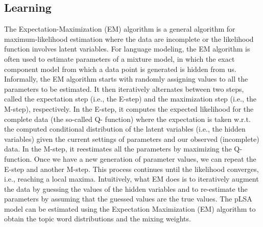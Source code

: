 \subsection{Learning}
The Expectation-Maximization (EM) algorithm is a general algorithm for maximum-likelihood estimation where the data are incomplete or the likelihood function involves latent variables. For language modeling, the EM algorithm is often used to estimate parameters of a mixture model, in which the exact component model from which a data point is generated is hidden from us. Informally, the EM algorithm starts with randomly assigning values to all the parameters to be estimated. It then iteratively alternates between two steps, called the expectation step (i.e., the E-step) and the maximization step (i.e., the M-step), respectively. In the E-step, it computes the expected likelihood for the complete data (the so-called Q- function) where the expectation is taken w.r.t. the computed conditional distribution of the latent variables (i.e., the hidden variables) given the current settings of parameters and our observed (incomplete) data. In the M-step, it reestimates all the parameters by maximizing the Q-function. Once we have a new generation of parameter values, we can repeat the E-step and another M-step. This process continues until the likelihood converges, i.e., reaching a local maxima. Intuitively, what EM does is to iteratively augment the data by guessing the values of the hidden variables and to re-estimate the parameters by assuming that the guessed values are the true values. \cite{dempster1977maximum}
The pLSA model can be estimated using the Expectation Maximization (EM) algorithm \cite{mei2001note} to obtain the topic word distributions and the mixing weights. 

